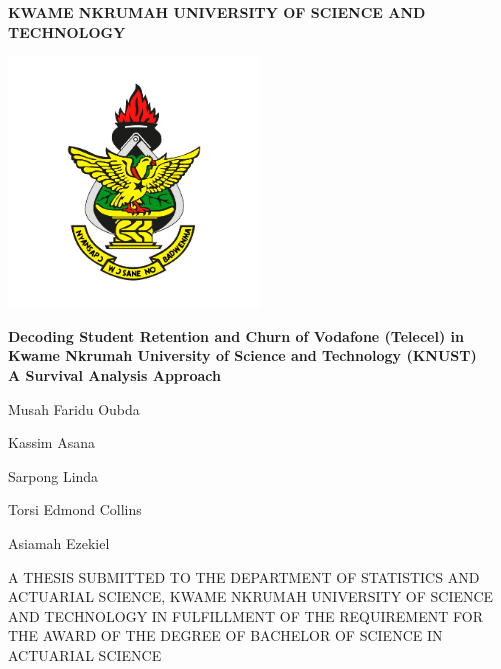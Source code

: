 \documentclass[doublespacing]{report} %
\begin{document}
\begin{titlepage}
\centering
    \Large\textbf{KWAME NKRUMAH UNIVERSITY OF SCIENCE AND TECHNOLOGY}
    
    
     \begin{center}
\includegraphics[width=0.5\textwidth]{logo.png}\end{center}

    \large{\textbf{Decoding Student Retention and Churn of
Vodafone (Telecel) in Kwame Nkrumah University
of Science and Technology (KNUST) }}
   \\
   \large{\textbf{A Survival Analysis Approach}}
    \vspace{0.3cm}
    
\large{Musah Faridu Oubda

Kassim Asana

Sarpong Linda

Torsi Edmond Collins

Asiamah Ezekiel}

    \vspace{0.4cm}  
    \small{A THESIS SUBMITTED TO THE DEPARTMENT OF STATISTICS AND ACTUARIAL SCIENCE, KWAME NKRUMAH UNIVERSITY OF SCIENCE AND TECHNOLOGY IN FULFILLMENT OF THE REQUIREMENT FOR THE AWARD OF THE DEGREE OF BACHELOR OF SCIENCE IN ACTUARIAL SCIENCE}\\


\end{titlepage}
\end{document}
